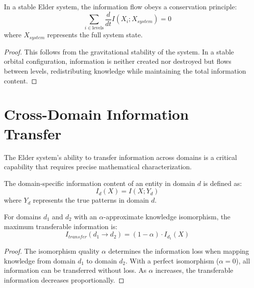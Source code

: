 \begin{theorem}
In a stable Elder system, the information flow obeys a conservation principle:
\begin{equation}
\sum_{i \in \text{levels}} \frac{d}{dt}I(X_i; X_{system}) = 0
\end{equation}
where $X_{system}$ represents the full system state.
\end{theorem}

\begin{proof}
This follows from the gravitational stability of the system. In a stable orbital configuration, information is neither created nor destroyed but flows between levels, redistributing knowledge while maintaining the total information content.
\end{proof}

\section{Cross-Domain Information Transfer}

The Elder system's ability to transfer information across domains is a critical capability that requires precise mathematical characterization.

\begin{definition}
The domain-specific information content of an entity in domain $d$ is defined as:
\begin{equation}
I_d(X) = I(X; Y_d)
\end{equation}
where $Y_d$ represents the true patterns in domain $d$.
\end{definition}

\begin{theorem}
For domains $d_1$ and $d_2$ with an $\alpha$-approximate knowledge isomorphism, the maximum transferable information is:
\begin{equation}
I_{transfer}(d_1 \to d_2) = (1 - \alpha) \cdot I_{d_1}(X)
\end{equation}
\end{theorem}

\begin{proof}
The isomorphism quality $\alpha$ determines the information loss when mapping knowledge from domain $d_1$ to domain $d_2$. With a perfect isomorphism ($\alpha = 0$), all information can be transferred without loss. As $\alpha$ increases, the transferable information decreases proportionally.
\end{proof}

